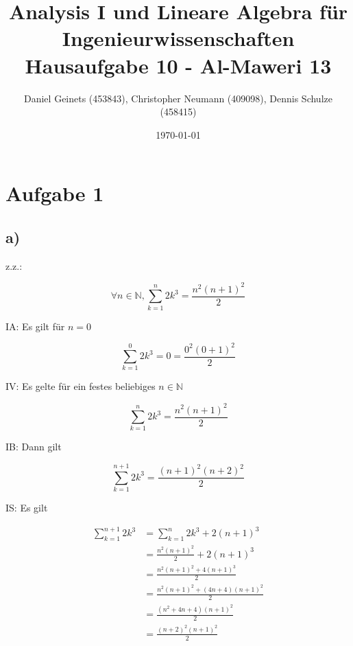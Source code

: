 \documentclass[a4paper, 11pt]{article}
\author{Daniel Geinets (453843), Christopher Neumann (409098), Dennis Schulze (458415)}
\date{\today}
\title{Analysis I und Lineare Algebra für Ingenieurwissenschaften \large  \\ Hausaufgabe 10 - Al-Maweri 13}
\begin{document}
\maketitle
\tableofcontents

\setcounter{secnumdepth}{0}
\newcommand{\tuple}[1]{\left(#1\right)}
\newcommand{\R}{\mathbb{R}}
\newcommand{\Z}{\mathbb{Z}}
\newcommand{\Q}{\mathbb{Q}}
\newcommand{\N}{\mathbb{N}}
\newcommand{\C}{\mathbb{C}}

\makeatletter
\renewcommand*\env@matrix[1][*\c@MaxMatrixCols c]{%
\hskip -\arraycolsep
\let\@ifnextchar\new@ifnextchar
\array{#1}}
\makeatother

\pagebreak

\section{Aufgabe 1}
\label{sec:org88bbaf0}
\subsection{a)}
\label{sec:org86509a3}
z.z.:

\begin{equation*}
    \forall n \in \N, \sum_{k = 1}^{n} 2 k^3 = \frac{n^2(n+1)^2}{2}
\end{equation*}

IA: Es gilt für \(n = 0\)

\begin{equation*}
    \sum_{k = 1}^{0} 2 k^3 = 0 = \frac{0^2(0+1)^2}{2}
\end{equation*}

IV: Es gelte für ein festes beliebiges \(n \in \N\)

\begin{equation*}
    \sum_{k = 1}^{n} 2 k^3 = \frac{n^2(n+1)^2}{2}
\end{equation*}

IB: Dann gilt

\begin{equation*}
    \sum_{k = 1}^{n+1} 2 k^3 = \frac{(n+1)^2(n+2)^2}{2}
\end{equation*}

IS: Es gilt

\begin{align*}
    \sum_{k = 1}^{n+1} 2 k^3 &= \sum_{k = 1}^{n} 2 k^3 + 2(n+1)^3 \\
    &= \frac{n^2(n+1)^2}{2} + 2(n+1)^3 \\
    &= \frac{n^2(n+1)^2 + 4(n+1)^3}{2} \\
    &= \frac{n^2(n+1)^2 + (4n + 4)(n+1)^2}{2} \\
    &= \frac{(n^2 + 4n + 4)(n+1)^2}{2} \\
    &= \frac{(n + 2)^2(n+1)^2}{2}
\end{align*}
\end{document}

